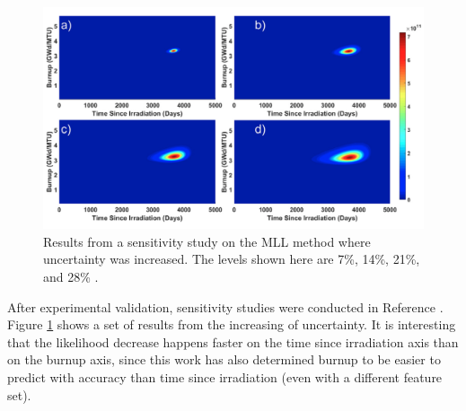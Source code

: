 \begin{figure}[!htb]
  \centering
  \includegraphics[width=\linewidth]{./chapters/litrev/tamu2.png}
  \caption{Results from a sensitivity study on the \gls{MLL} method where 
           uncertainty was increased. The levels shown here are 7\%, 14\%, 
           21\%, and 28\% \cite{mll_sensitivity}.}
  \label{fig:tamu2}
\end{figure}

After experimental validation, sensitivity studies were conducted in Reference
\cite{mll_sensitivity}.  Figure \ref{fig:tamu2} shows a set of results from the
increasing of uncertainty. It is interesting that the likelihood decrease
happens faster on the time since irradiation axis than on the burnup axis,
since this work has also determined burnup to be easier to predict with
accuracy than time since irradiation (even with a different feature set).
